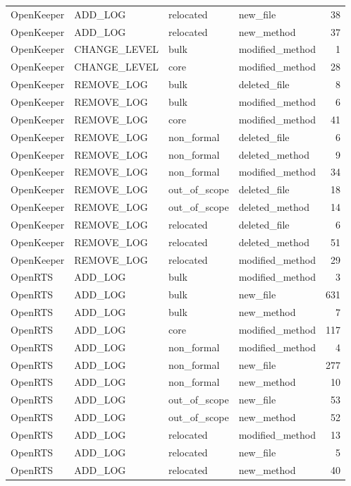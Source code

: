 {\begin{longtable}{llllr}
OpenKeeper & ADD\_LOG & relocated & new\_file & 38 \\
OpenKeeper & ADD\_LOG & relocated & new\_method & 37 \\
OpenKeeper & CHANGE\_LEVEL & bulk & modified\_method & 1 \\
OpenKeeper & CHANGE\_LEVEL & core & modified\_method & 28 \\
OpenKeeper & REMOVE\_LOG & bulk & deleted\_file & 8 \\
OpenKeeper & REMOVE\_LOG & bulk & modified\_method & 6 \\
OpenKeeper & REMOVE\_LOG & core & modified\_method & 41 \\
OpenKeeper & REMOVE\_LOG & non\_formal & deleted\_file & 6 \\
OpenKeeper & REMOVE\_LOG & non\_formal & deleted\_method & 9 \\
OpenKeeper & REMOVE\_LOG & non\_formal & modified\_method & 34 \\
OpenKeeper & REMOVE\_LOG & out\_of\_scope & deleted\_file & 18 \\
OpenKeeper & REMOVE\_LOG & out\_of\_scope & deleted\_method & 14 \\
OpenKeeper & REMOVE\_LOG & relocated & deleted\_file & 6 \\
OpenKeeper & REMOVE\_LOG & relocated & deleted\_method & 51 \\
OpenKeeper & REMOVE\_LOG & relocated & modified\_method & 29 \\
OpenRTS & ADD\_LOG & bulk & modified\_method & 3 \\
OpenRTS & ADD\_LOG & bulk & new\_file & 631 \\
OpenRTS & ADD\_LOG & bulk & new\_method & 7 \\
OpenRTS & ADD\_LOG & core & modified\_method & 117 \\
OpenRTS & ADD\_LOG & non\_formal & modified\_method & 4 \\
OpenRTS & ADD\_LOG & non\_formal & new\_file & 277 \\
OpenRTS & ADD\_LOG & non\_formal & new\_method & 10 \\
OpenRTS & ADD\_LOG & out\_of\_scope & new\_file & 53 \\
OpenRTS & ADD\_LOG & out\_of\_scope & new\_method & 52 \\
OpenRTS & ADD\_LOG & relocated & modified\_method & 13 \\
OpenRTS & ADD\_LOG & relocated & new\_file & 5 \\
OpenRTS & ADD\_LOG & relocated & new\_method & 40 \\

\end{longtable}}
